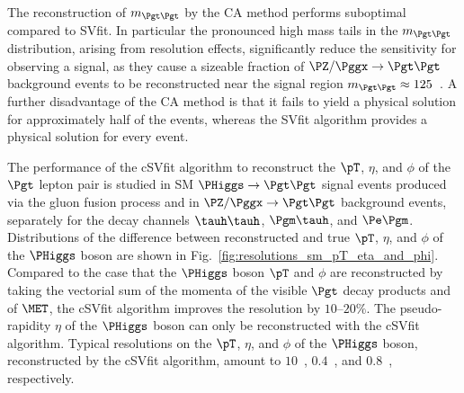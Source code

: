 The reconstruction of $m_{\Pgt\Pgt}$ by the CA method performs suboptimal compared to SVfit.
In particular the pronounced high mass tails in the $m_{\Pgt\Pgt}$ distribution, arising from resolution effects,
significantly reduce the sensitivity for observing a signal,
as they cause a sizeable fraction of $\PZ/\Pggx \to \Pgt\Pgt$ background events
to be reconstructed near the signal region $m_{\Pgt\Pgt} \approx 125$~\GeV.
A further disadvantage of the CA method is that it fails to yield a physical solution for approximately half of the events,
whereas the SVfit algorithm provides a physical solution for every event. 

The performance of the cSVfit algorithm to reconstruct the $\pT$,
$\eta$, and $\phi$ of the $\Pgt$ lepton pair is studied in SM $\PHiggs
\to \Pgt\Pgt$ signal events produced via the gluon fusion process
and in $\PZ/\Pggx \to \Pgt\Pgt$ background events,
separately for the decay channels $\tauh\tauh$, $\Pgm\tauh$, and $\Pe\Pgm$.
Distributions of the difference between reconstructed and true $\pT$,
$\eta$, and $\phi$ of the $\PHiggs$ boson are shown in
Fig.~\ref{fig:resolutions_sm_pT_eta_and_phi}.
Compared to the case that the $\PHiggs$ boson $\pT$ and $\phi$ are
reconstructed by taking the vectorial sum of the momenta of the visible $\Pgt$
decay products and of $\MET$, the cSVfit algorithm improves the
resolution by $10$--$20\%$. The pseudo-rapidity $\eta$ of the
$\PHiggs$ boson can only be reconstructed with the cSVfit algorithm.
Typical resolutions on the $\pT$, $\eta$, and $\phi$ of the $\PHiggs$ boson,
reconstructed by the cSVfit algorithm, amount to $10$~\GeV, $0.4$~\rad, and $0.8$~\rad,
respectively.

%
%

